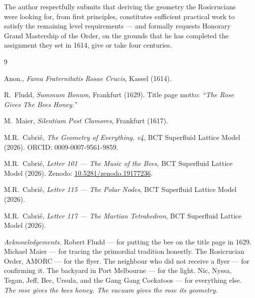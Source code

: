 \documentclass[12pt,twocolumn]{article}
\begin{document}
The author respectfully submits that deriving the geometry
the Rosicrucians were looking for, from first principles,
constitutes sufficient practical work to satisfy the
remaining level requirements --- and formally requests
Honorary Grand Mastership of the Order, on the grounds
that he has completed the assignment they set in 1614,
give or take four centuries. \dag

\begin{thebibliography}{9}

Anon.,
\textit{Fama Fraternitatis Rosae Crucis},
Kassel (1614).

R.\ Fludd,
\textit{Summum Bonum},
Frankfurt (1629).
Title page motto: \textit{``The Rose Gives The Bees Honey.''}

M.\ Maier,
\textit{Silentium Post Clamores},
Frankfurt (1617).

M.R.\ Cabri\'{e},
\textit{The Geometry of Everything, v4},
BCT Superfluid Lattice Model (2026).
ORCID: 0009-0007-9561-9859.

M.R.\ Cabri\'{e},
\textit{Letter 101 --- The Music of the Bees},
BCT Superfluid Lattice Model (2026).
Zenodo: \href{https://doi.org/10.5281/zenodo.19177236}
{10.5281/zenodo.19177236}.

M.R.\ Cabri\'{e},
\textit{Letter 115 --- The Polar Nodes},
BCT Superfluid Lattice Model (2026).

M.R.\ Cabri\'{e},
\textit{Letter 117 --- The Martian Tetrahedron},
BCT Superfluid Lattice Model (2026).

\end{thebibliography}

\bigskip\noindent
\textit{Acknowledgements.}
Robert Fludd --- for putting the bee on the title page in 1629.
Michael Maier --- for tracing the primordial tradition honestly.
The Rosicrucian Order, AMORC --- for the flyer.
The neighbour who did not receive a flyer --- for confirming it.
The backyard in Port Melbourne --- for the light.
Nic, Nyssa, Tegan, Jeff, Bec, Ursula, and the Gang Gang
Cockatoos --- for everything else.
\textit{The rose gives the bees honey.
The vacuum gives the rose its geometry.} \dag
\end{document}
